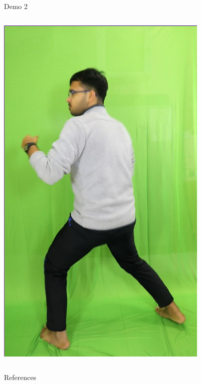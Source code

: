 \begin{frame}{Demo 2}
\begin{columns}
\begin{center}
            \href{run:videos/shashank_green.mp4}{\includegraphics[scale=0.2]{imgs/shashank_green.png}} 
        \end{center}
    \end{columns}   
\end{frame}

\begin{frame}{References}
    
    
\end{frame}


        
        

